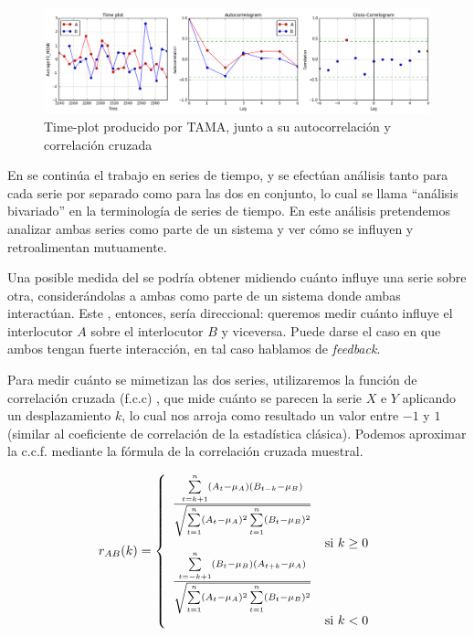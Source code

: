 \begin{figure}[t]
\centering
\includegraphics[width=\textwidth]{images/time_plot_with_cross_correlation.png}
\caption{Time-plot producido por TAMA, junto a su autocorrelación y correlación cruzada}
\end{figure}

\newcommand{\squarederr}[1]{
    \sum\limits_{t=1}^n \varnorm{#1}^2
}

\newcommand{\crosscorr}[2]{
  \frac{\sum\limits_{t=|k|+1}^n \varnorm{#1} (#2_{t-k} - \mu_{#2})}{
    \sqrt{\squarederr{#1} \squarederr{#2}}
  } \\
}

\newcommand{\corrdenom}{\sqrt{\squarederr{A}\squarederr{B}}}

En \cite{KOU2008.2} se continúa el trabajo en series de tiempo, y se efectúan análisis tanto para cada serie por separado como para las dos en conjunto, lo cual se llama ``análisis bivariado'' en la terminología de series de tiempo. En este análisis pretendemos analizar ambas series como parte de un sistema y ver cómo se influyen y retroalimentan mutuamente.

Una posible medida del \entrainment se podría obtener midiendo cuánto influye una serie sobre otra, considerándolas a ambas como parte de un sistema donde ambas interactúan. Este \entrainment, entonces, sería direccional: queremos medir cuánto influye el interlocutor $A$ sobre el interlocutor $B$ y viceversa. Puede darse el caso en que ambos tengan fuerte interacción, en tal caso hablamos de \emph{feedback}.

Para medir cuánto se mimetizan las dos series, utilizaremos la función de correlación cruzada (f.c.c) \cite{CHATFIELD}, que mide cuánto se parecen la serie $X$ e $Y$ aplicando un desplazamiento $k$, lo cual nos arroja como resultado un valor entre $-1$ y $1$ (similar al coeficiente de correlación de la estadística clásica). Podemos aproximar la c.c.f. mediante la fórmula de la correlación cruzada muestral.

\begin{equation}
  \label{cross_correlation_definition}
  r_{AB}(k) =
  \left\{
    \begin{array}{ll}
      \frac{\sum\limits_{t=k+1}^n \varnorm{A} (B_{t-k} - \mu_{B})}{\corrdenom} \\ & \mbox{si } k \geq 0 \\
      \frac{\sum\limits_{t=-k+1}^n \varnorm{B} (A_{t+k} - \mu_{A})}{\corrdenom} \\  & \mbox{si } k < 0
    \end{array}
  \right.
\end{equation}

